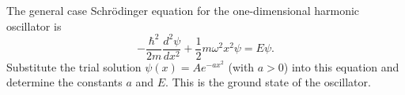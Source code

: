
\begin{problem}
\label{prob:harmonicOsc_ground}
 The general case Schr\"{o}dinger equation for the one-dimensional
 harmonic oscillator is
\[ -\frac{\hbar^2}{2m}\frac{d^2\psi}{dx^2} + \frac{1}{2}m\omega^2 x^2 \psi
   = E\psi.      \]
Substitute the trial solution $\psi(x) = Ae^{-ax^2}$ (with $a>0$) 
into this equation and determine the constants $a$ and $E$. This 
is the ground state of the oscillator.  
\end{problem}





